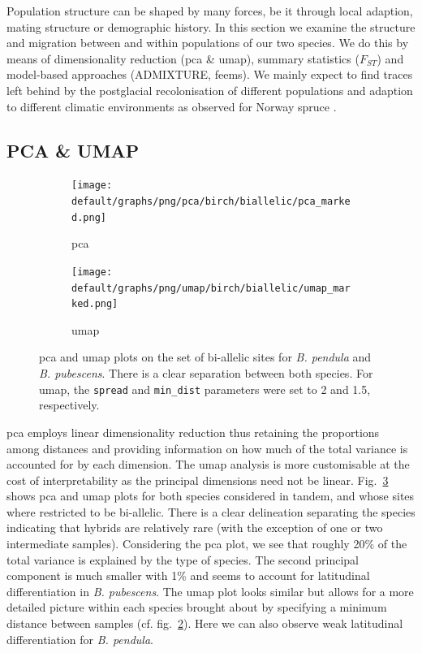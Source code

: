 \documentclass[hidelinks,11pt]{article}
\newcommand{\pendula}{\textit{B. pendula}}
\newcommand{\pubescens}{\textit{B. pubescens}}
\begin{document}
{    Population structure can be shaped by many forces, be it through local adaption, mating structure or demographic history. In this section we examine the structure and migration between and within populations of our two species. We do this by means of dimensionality reduction (\acrshort{pca} \& \acrshort{umap}), summary statistics ($F_{ST}$) and model-based approaches (\mbox{ADMIXTURE}, \acrshort{feems}). We mainly expect to find traces left behind by the postglacial recolonisation of different populations and adaption to different climatic environments as observed for Norway spruce \cite{spruce-demography}.

    \subsection{PCA \& UMAP}
    \label{sec:pca-umap}

    \begin{figure}[ht]
        \centering
        \begin{subfigure}[b]{0.48\textwidth}
            \centering
            \texttt{[image: default/graphs/png/pca/birch/biallelic/pca\_marked.png]}
            \caption{\acrshort{pca}}
            \label{fig:pca_pendula_pubescens}
        \end{subfigure}
        \hfill
        \begin{subfigure}[b]{0.49\textwidth}
            \centering
            \texttt{[image: default/graphs/png/umap/birch/biallelic/umap\_marked.png]}
            \caption{\acrshort{umap}}
            \label{fig:umap_pendula_pubescens}
        \end{subfigure}
        \caption{\acrshort{pca} and \acrshort{umap} plots on the set of bi-allelic sites for \pendula{} and \pubescens{}. There is a clear separation between both species. For \acrshort{umap}, the \texttt{spread} and \texttt{min\_dist} parameters were set to 2 and 1.5, respectively.}
        \label{fig:pca_umap_pendula_pubescens}
    \end{figure}

    \acrfull{pca} employs linear dimensionality reduction thus retaining the proportions among distances and providing information on how much of the total variance is accounted for by each dimension. The \acrfull{umap} analysis is more customisable at the cost of interpretability as the principal dimensions need not be linear. Fig.~\ref{fig:pca_umap_pendula_pubescens} shows \acrshort{pca} and \acrshort{umap} plots for both species considered in tandem, and whose sites where restricted to be bi-allelic. There is a clear delineation separating the species indicating that hybrids are relatively rare (with the exception of one or two intermediate samples). Considering the \acrshort{pca} plot, we see that roughly 20\% of the total variance is explained by the type of species. The second principal component is much smaller with 1\% and seems to account for latitudinal differentiation in \pubescens{}. The \acrshort{umap} plot looks similar but allows for a more detailed picture within each species brought about by specifying a minimum distance between samples (cf. fig.~\ref{fig:umap_pendula_pubescens}). Here we can also observe weak latitudinal differentiation for \pendula{}.

}
\end{document}
